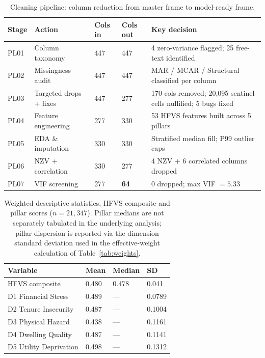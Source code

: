 \documentclass[3p,twocolumn,10pt]{elsarticle}
\begin{document}
\begin{table}[t]
\centering\small
\caption{Cleaning pipeline: column reduction from master frame to model-ready frame.}
\label{tab:pipeline}
\setlength{\tabcolsep}{6pt}
\begin{tabular}{@{}C{1.2cm}L{4.0cm}R{1.4cm}R{1.4cm}L{8.0cm}@{}}
\toprule
Stage & Action & Cols in & Cols out & Key decision \\
\midrule
PL01 & Column taxonomy        & 447 & 447 & 4 zero-variance flagged; 25 free-text identified \\
PL02 & Missingness audit      & 447 & 447 & MAR / MCAR / Structural classified per column \\
PL03 & Targeted drops + fixes & 447 & 277 & 170 cols removed; 20,095 sentinel cells nullified; 5 bugs fixed \\
PL04 & Feature engineering    & 277 & 330 & 53 HFVS features built across 5 pillars \\
PL05 & EDA \& imputation      & 330 & 330 & Stratified median fill; P99 outlier caps \\
PL06 & NZV + correlation      & 330 & 277 & 4 NZV + 6 correlated columns dropped \\
PL07 & VIF screening          & 277 & \textbf{64} & 0 dropped; max VIF $= 5.33$ \\
\bottomrule
\end{tabular}
\end{table}

\begin{table}[t]
\centering\small
\caption{Weighted descriptive statistics, HFVS composite and pillar scores ($n=21{,}347$).
Pillar medians are not separately tabulated in the underlying analysis; pillar dispersion
is reported via the dimension standard deviation used in the effective-weight calculation
of Table~\ref{tab:weights}.}
\label{tab:descriptive}
\setlength{\tabcolsep}{4pt}
\begin{tabular}{@{}L{2.9cm}R{1.1cm}R{1.1cm}R{1.1cm}@{}}
\toprule
Variable & Mean & Median & SD \\
\midrule
HFVS composite          & 0.480 & 0.478 & 0.041 \\
D1 Financial Stress     & 0.489 & ---   & 0.0789 \\
D2 Tenure Insecurity    & 0.487 & ---   & 0.1004 \\
D3 Physical Hazard      & 0.438 & ---   & 0.1161 \\
D4 Dwelling Quality     & 0.487 & ---   & 0.1141 \\
D5 Utility Deprivation  & 0.498 & ---   & 0.1312 \\
\bottomrule
\end{tabular}
\end{table}
\end{document}
